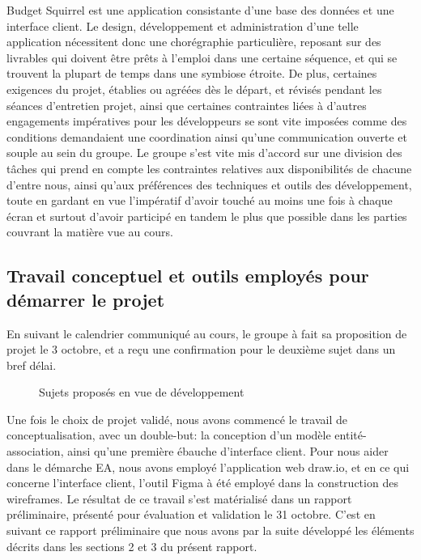 \documentclass[a4paper,12pt]{article}
\begin{document}
Budget Squirrel est une application consistante d'une base des données et une interface client. Le design, développement et administration d'une telle application nécessitent donc une chorégraphie particulière, reposant sur des livrables qui doivent être prêts à l'emploi dans une certaine séquence, et qui se trouvent la plupart de temps dans une symbiose étroite. De plus, certaines exigences du projet, établies ou agréées dès le départ, et révisés pendant les séances d'entretien projet, ainsi que certaines contraintes liées à d'autres engagements impératives pour les développeurs se sont vite imposées comme des conditions demandaient une coordination ainsi qu'une communication ouverte et souple au sein du groupe. Le groupe s'est vite mis d'accord sur une division des tâches qui prend en compte les contraintes relatives aux disponibilités de chacune d'entre nous, ainsi qu'aux préférences des techniques et outils des développement, toute en gardant en vue l'impératif d'avoir touché au moins une fois à chaque écran et surtout d'avoir participé en tandem le plus que possible dans les parties couvrant la matière vue au cours.

\subsection{Travail conceptuel et outils employés pour démarrer le projet}

En suivant le calendrier communiqué au cours, le groupe à fait sa proposition de projet le 3 octobre, et a reçu une confirmation pour le deuxième sujet dans un bref délai.

\begin{figure}[!ht]
\noindent
{}
\caption{\footnotesize{Sujets proposés en vue de développement}}
\end{figure}

Une fois le choix de projet validé, nous avons commencé le travail de conceptualisation, avec un double-but: la conception d'un modèle entité-association, ainsi qu'une première ébauche d'interface client. Pour nous aider dans le démarche EA, nous avons employé l'application web draw.io, et en ce qui concerne l'interface client, l'outil Figma à été employé dans la construction des wireframes. Le résultat de ce travail s'est matérialisé dans un rapport préliminaire, présenté pour évaluation et validation le 31 octobre. C'est en suivant ce rapport préliminaire  que nous avons par la suite développé les éléments décrits dans les sections 2 et 3 du présent rapport.
 
\end{document}
